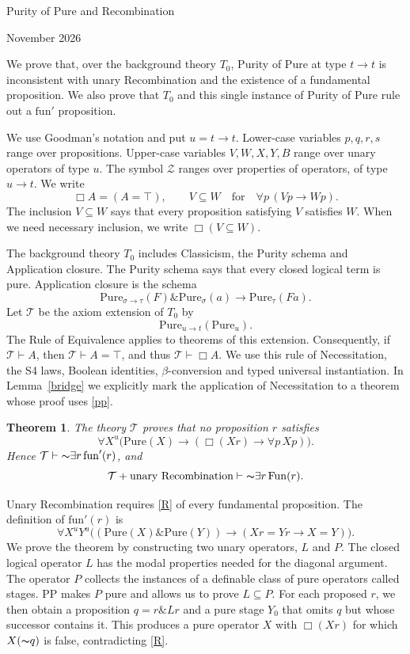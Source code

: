 \documentclass[12pt,leqno]{article}
\newcommand{\AND}{\ensuremath{\mathbin{\&}}}
\newcommand{\IC}{\ensuremath{\rightarrow}}
\newcommand{\NOT}{\ensuremath{\text{$\thicksim$}}}
\newcommand{\Pure}{\mathrm{Pure}}
\newcommand{\Fun}{\mathrm{Fun}}
\newcommand{\funp}{\mathrm{fun}'}
\newcommand{\Th}{\mathcal T}
\newcommand{\cZ}{\mathcal Z}
\newtheorem{theorem}{Theorem}
\begin{document}
\begin{center}
{\Large Purity of Pure and Recombination}

 November 2026
\end{center}

We prove that, over the background theory $T_0$, Purity of Pure at type
$t\to t$ is inconsistent with unary Recombination and the existence of
a fundamental proposition. We also prove that $T_0$ and this single instance of Purity of Pure rule
out a $\funp$ proposition.

We use Goodman's notation and put $u=t\to t$. Lower-case variables
$p,q,r,s$ range over propositions. Upper-case variables $V,W,X,Y,B$ range
over unary operators of type $u$. The symbol $\cZ$ ranges over properties
of operators, of type $u\to t$. We write
\[
 \Box A=(A=\top),\qquad
 V\subseteq W\quad\text{for}\quad\forall p\,(Vp\IC Wp).
\]
The inclusion $V\subseteq W$ says that every proposition satisfying $V$ satisfies $W$.
When we need necessary inclusion, we write $\Box(V\subseteq W)$.

The background theory $T_0$ includes Classicism, the Purity schema and
Application closure. The Purity schema says that every closed logical
term is pure. Application closure is the schema
\[
 \Pure_{\sigma\to\tau}(F)\AND\Pure_\sigma(a)
       \IC\Pure_\tau(Fa).
\]
Let $\Th$ be the axiom extension of $T_0$ by
\begin{equation}
 \Pure_{u\to t}(\Pure_u).
 \tag{PP$_u$}\label{pp}
\end{equation}
The Rule of Equivalence applies to theorems of this extension.
Consequently, if $\Th\vdash A$, then $\Th\vdash A=\top$, and thus
$\Th\vdash\Box A$. We use this rule of Necessitation, the S4 laws,
Boolean identities, $\beta$-conversion and typed universal instantiation.
In Lemma~\ref{bridge} we explicitly mark the application of Necessitation
to a theorem whose proof uses \eqref{pp}.

\begin{theorem}\label{main}
The theory $\Th$ proves that no proposition $r$ satisfies
\begin{equation}
 \forall X^u\bigl(\Pure(X)\IC
        (\Box(Xr)\IC\forall p\,Xp)\bigr).
 \tag{R}\label{R}
\end{equation}
Hence $\Th\vdash\NOT\exists r\,\funp(r)$, and
\[
 \Th+\text{unary Recombination}\vdash\NOT\exists r\,\Fun(r).
\]
\end{theorem}

Unary Recombination requires \eqref{R} of every fundamental proposition.
The definition of $\funp(r)$ is
\[
 \forall X^uY^u\bigl((\Pure(X)\AND\Pure(Y))
           \IC(Xr=Yr\IC X=Y)\bigr).
\]
We prove the theorem by constructing two unary operators, $L$ and $P$.
The closed logical operator $L$ has the modal properties needed for the
diagonal argument. The operator $P$ collects the instances of a
definable class of pure operators called stages. PP makes $P$ pure and
allows us to prove $L\subseteq P$. For each proposed $r$, we then obtain
a proposition $q=r\AND Lr$ and a pure stage $Y_0$ that omits $q$ but
whose successor contains it. This produces a pure operator $X$ with
$\Box(Xr)$ for which $X(\NOT q)$ is false, contradicting \eqref{R}.
\end{document}
